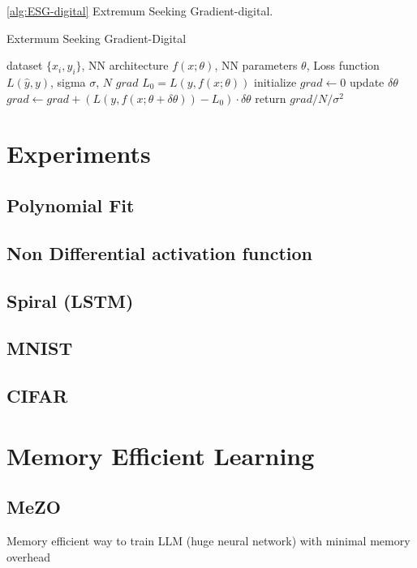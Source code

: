\documentclass[nohyperref]{article}
\theoremstyle{plain}
\theoremstyle{definition}
\theoremstyle{remark}
\begin{document}
\cref{alg:ESG-digital} Extremum Seeking Gradient-digital.

\begin{algorithm}[tb]
   \caption{Extermum Seeking Gradient-Digital}
   \label{alg:ESG-digital}
\begin{algorithmic}
   dataset $\{x_{i},y_{i}\}$, NN architecture $f(x;\theta)$, NN parameters $\theta$, Loss function $L(\hat{y},y)$, sigma $\sigma$, $N$
   $grad$  
   \STATE $L_{0} = L(y,f(x;\theta))$
   \STATE initialize $grad \leftarrow 0$
   \STATE update $\delta\theta$
   \STATE $grad \leftarrow grad + (L(y,f(x;\theta+\delta \theta))-L_{0})\cdot\delta \theta$
   \ENDFOR
   \STATE return $grad/N/\sigma^{2}$
\end{algorithmic}
\end{algorithm}


\section{Experiments}
\subsection{Polynomial Fit}
\subsection{Non Differential activation function}
\subsection{Spiral (LSTM)}
\subsection{MNIST}
\subsection{CIFAR}


\section{Memory Efficient Learning}
\subsection{MeZO}
Memory efficient way to train LLM (huge neural network) with minimal memory overhead \cite{malladi2023finetuning}
\end{document}
